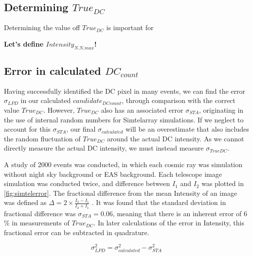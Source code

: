 \documentclass{article}
\begin{document}
\subsection{Determining $True_{DC}$}
Determining the value off $True_{DC}$ is important for 

\textbf{Let's define $Intensity_{N.N.max}$!}
 

\subsection{Error in calculated $DC_{count}$}
Having successfully identified the DC pixel in many events, we can find the error $\sigma_{LPD}$ in our calculated $candidate_{DC count}$, through comparison with the correct value $True_{DC}$. However, $True_{DC}$ also has an associated error $\sigma_{STA}$, originating in the use of internal random numbers for Sim\textunderscore telarray simulations. If we neglect to account for this $\sigma_{STA}$, our final $\sigma_{calculated}$ will be an overestimate that also includes the random fluctuation of $True_{DC}$ around the actual DC intensity. As we cannot directly measure the actual DC intensity, we must instead measure $\sigma_{TrueDC}$. 

A study of 2000 events was conducted, in which each cosmic ray was simulation without night sky background or EAS background. Each telescope image simulation was conducted twice, and difference between $I_{1}$ and $I_{2}$ was plotted in \ref{fig:simtelerror}. The fractional difference from the mean Intensity of an image was defined as $\Delta = 2 \times \frac{I_{2} - I_{1}}{{I_{2} + I_{1}}}$ . It was found that the standard deviation in fractional difference was $\sigma_{STA}=0.06$, meaning that there is an inherent error of 6 \% in measurements of $True_{DC}$. In later calculations of the error in Intensity, this fractional error can be subtracted in quadrature. 

\[ \sigma_{LPD}^{2} = \sigma_{calculated}^{2} - \sigma_{STA}^{2}  \]
\end{document}
